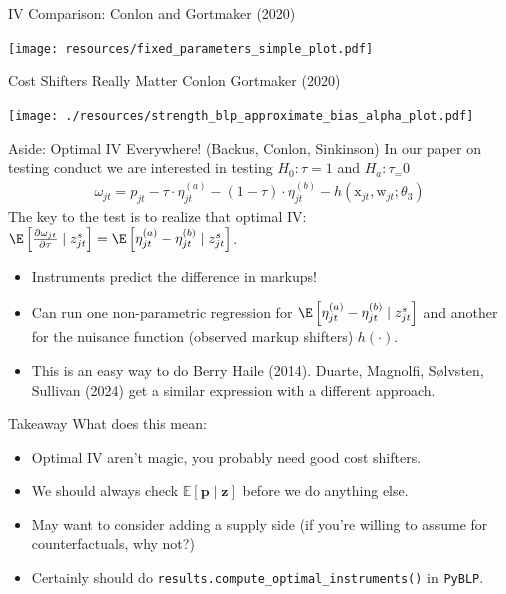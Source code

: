 \begin{frame}{IV Comparison: Conlon and Gortmaker (2020)}
\begin{center}
\texttt{[image: resources/fixed\_parameters\_simple\_plot.pdf]}
\end{center}
\end{frame}


\begin{frame}{Cost Shifters Really Matter Conlon Gortmaker (2020)}
\begin{center}
    \texttt{[image: ./resources/strength\_blp\_approximate\_bias\_alpha\_plot.pdf]}
\end{center}
\end{frame}

\begin{frame}{Aside: Optimal IV Everywhere! (Backus, Conlon, Sinkinson)}
In our paper on testing conduct we are interested in testing $H_0: \tau=1$ and $H_a: \tau_=0$
\begin{align*}
\omega_{jt} = p_{jt} -\tau \cdot \eta_{jt}^{(a)} - (1-\tau) \cdot \eta_{jt}^{(b)} - h(\textrm{x}_{jt},\textrm{w}_{jt}; \theta_3) 
\end{align*}
The key to the test is to realize that optimal IV: $\E\left[\frac{\partial \omega_{jt}}{\partial \tau} \mid z_{jt}^s \right] = \E\left[\eta_{jt}^{(a)} -\eta_{jt}^{(b)} \mid z_{jt}^s \right]$.
\begin{itemize}
    \item Instruments \alert{predict the difference in markups}!
    \item Can run one non-parametric regression for  $\E\left[\eta_{jt}^{(a)} -\eta_{jt}^{(b)} \mid z_{jt}^s \right]$ and another for the nuisance function (observed markup shifters) $h(\cdot)$.
    \item This is an easy way to do Berry Haile (2014). Duarte, Magnolfi, Sølvsten, Sullivan (2024) get a similar expression with a different approach.
\end{itemize}
\end{frame}


\begin{frame}{Takeaway}
What does this mean:
\begin{itemize}
    \item Optimal IV aren't magic, you probably need good cost shifters.
    \item We should always check $\mathbb{E}[\mathbf{p} \mid \mathbf{z}]$ before we do anything else.
    \item May want to consider adding a supply side (if you're willing to assume for counterfactuals, why not?)
    \item Certainly should do \texttt{results.compute\_optimal\_instruments()} in \texttt{PyBLP}.
\end{itemize}
\end{frame}


